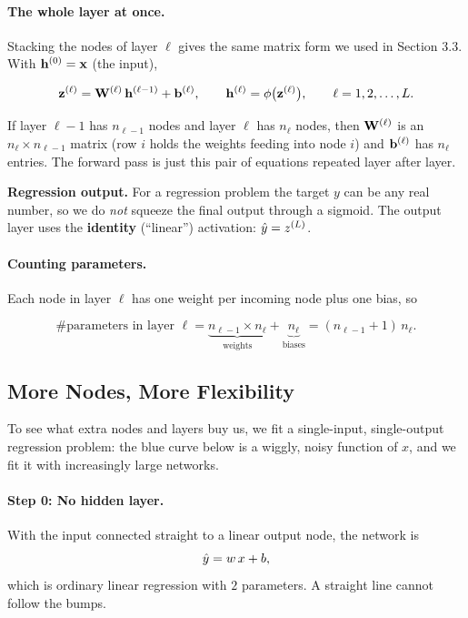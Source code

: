 \documentclass[12pt, a4paper]{article}
\begin{document}
\paragraph{The whole layer at once.}
Stacking the nodes of layer $\ell$ gives the same matrix form we used in
Section 3.3. With $\mathbf{h}^{(0)} = \mathbf{x}$ (the input),
\begin{resultbox}
  \[
    \mathbf{z}^{(\ell)} = \mathbf{W}^{(\ell)}\,\mathbf{h}^{(\ell-1)} + \mathbf{b}^{(\ell)},
    \qquad
    \mathbf{h}^{(\ell)} = \phi\bigl(\mathbf{z}^{(\ell)}\bigr),
    \qquad \ell = 1, 2, \dots, L.
  \]
\end{resultbox}
If layer $\ell-1$ has $n_{\ell-1}$ nodes and layer $\ell$ has $n_\ell$ nodes,
then $\mathbf{W}^{(\ell)}$ is an $n_\ell \times n_{\ell-1}$ matrix (row $i$ holds the
weights feeding into node $i$) and $\mathbf{b}^{(\ell)}$ has $n_\ell$ entries.
The forward pass is just this pair of equations repeated layer after layer.

\begin{notebox}
  \textbf{Regression output.} For a regression problem the target $y$ can be
  any real number, so we do \emph{not} squeeze the final output through a
  sigmoid. The output layer uses the \textbf{identity} (``linear'')
  activation: $\hat{y} = z^{(L)}$.
\end{notebox}

\paragraph{Counting parameters.}
Each node in layer $\ell$ has one weight per incoming node plus one bias, so
\begin{resultbox}
  \[
    \#\text{parameters in layer } \ell
    = \underbrace{n_{\ell-1} \times n_\ell}_{\text{weights}}
    + \underbrace{n_\ell}_{\text{biases}}
    = (n_{\ell-1} + 1)\, n_\ell .
  \]
\end{resultbox}

\subsection{More Nodes, More Flexibility}
\label{sec:flexibility}

To see what extra nodes and layers buy us, we fit a single-input,
single-output regression problem: the blue curve below is a wiggly,
noisy function of $x$, and we fit it with increasingly large networks.

\paragraph{Step 0: No hidden layer.}
With the input connected straight to a linear output node, the network is
\[
  \hat{y} = w\,x + b,
\]
which is ordinary linear regression with $2$ parameters. A straight line
cannot follow the bumps.
\end{document}
